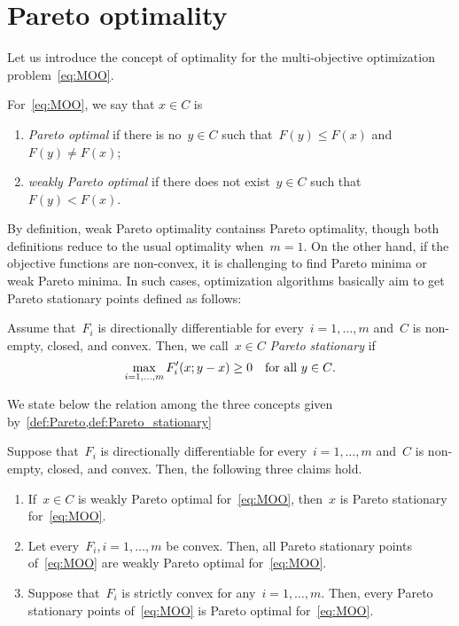 \documentclass[../main]{subfiles}
\begin{document}
\section{Pareto optimality}
Let us introduce the concept of optimality for the multi-objective optimization problem~\cref{eq:MOO}.
\begin{definition} \label{def:Pareto}
    For~\cref{eq:MOO}, we say that $x \in C$ is
    \begin{enumerate}
        \item \emph{Pareto optimal} if there is no~$y \in C$ such that~$F(y) \le F(x)$ and~$F(y) \neq F(x)$; \label{def:Pareto:Pareto}
        \item \emph{weakly Pareto optimal} if there does not exist~$y \in C$ such that~$F(y) < F(x)$. \label{def:Pareto:weak}
    \end{enumerate}
\end{definition}
By definition, weak Pareto optimality containss Pareto optimality, though both definitions reduce to the usual optimality when~$m = 1$.
On the other hand, if the objective functions are non-convex, it is challenging to find Pareto minima or weak Pareto minima.
In such cases, optimization algorithms basically aim to get Pareto stationary points defined as follows:
\begin{definition} \label{def:Pareto_stationary}
    Assume that~$F_i$ is directionally differentiable for every~$i = 1, \dots, m$ and~$C$ is non-empty, closed, and convex.
    Then, we call~$x \in C$ \emph{Pareto stationary} if~
    \[
        \max_{i = 1, \dots, m} F_i'(x; y - x) \ge 0 \quad \text{for all~$y \in C$}
    .\] 
\end{definition}
We state below the relation among the three concepts given by~\cref{def:Pareto,def:Pareto_stationary}
\begin{lemma} \label{thm:Pareto}
    Suppose that~$F_i$ is directionally differentiable for every~$i = 1, \dots, m$ and~$C$ is non-empty, closed, and convex.
    Then, the following three claims hold.
    \begin{enumerate}
        \item If~$x \in C$ is weakly Pareto optimal for~\cref{eq:MOO}, then~$x$ is Pareto stationary for~\cref{eq:MOO}. \label{thm:Pareto:weak_stationary}
        \item Let every~$F_i, i = 1, \dots, m$ be convex. Then, all Pareto stationary points of~\cref{eq:MOO} are weakly Pareto optimal for~\cref{eq:MOO}. \label{thm:Pareto:convex}
        \item Suppose that~$F_i$ is strictly convex for any~$i = 1, \dots, m$. Then, every Pareto stationary points of~\cref{eq:MOO} is Pareto optimal for~\cref{eq:MOO}. \label{thm:Pareto:strict_convex}
    \end{enumerate}
\end{lemma}
\end{document}
